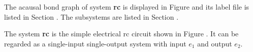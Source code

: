 

   The acausal bond graph of system \textbf{rc} is
   displayed in Figure  and its label
   file is listed in Section .
   The subsystems are listed in Section .

The system \textbf{rc} is the simple electrical rc circuit shown in
Figure . It can be regarded as a single-input
single-output system with input $e_1$ and output $e_2$.
